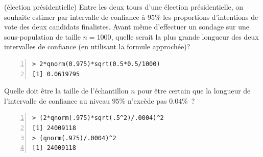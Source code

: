 \documentclass[10pt]{report}
\begin{document}
\begin{exercice} (élection présidentielle) 
Entre les deux tours d'une {\'e}lection pr{\'e}sidentielle, on souhaite estimer par intervalle de confiance {\`a} 95\% les proportions d'intentions de vote des deux candidats finalistes. Avant m{\^e}me d'effectuer un sondage sur une sous-population de taille $n=1000$, quelle serait la plus grande longueur des deux intervalles de confiance (en utilisant la formule approch{\'e}e)? \\

\IndicR
\begin{Verbatim}[frame=leftline,fontfamily=tt,fontshape=n,numbers=left]
> 2*qnorm(0.975)*sqrt(0.5*0.5/1000)
[1] 0.0619795
\end{Verbatim}


Quelle doit {\^e}tre la taille de l'{\'e}chantillon $n$  pour {\^e}tre certain que
la longueur de l'intervalle de confiance au niveau $95\%$ n'exc{\`e}de pas
$0.04\%$~? \\


\IndicR
\begin{Verbatim}[frame=leftline,fontfamily=tt,fontshape=n,numbers=left]
> (2*qnorm(.975)*sqrt(.5^2)/.0004)^2
[1] 24009118
> (qnorm(.975)/.0004)^2
[1] 24009118
\end{Verbatim}


\end{exercice}
\end{document}
